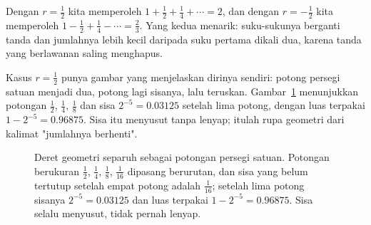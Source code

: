 Dengan $r = \tfrac{1}{2}$ kita memperoleh $1 + \tfrac{1}{2} + \tfrac{1}{4} + \cdots = 2$,
dan dengan $r = -\tfrac{1}{2}$ kita memperoleh $1 - \tfrac{1}{2} + \tfrac{1}{4} - \cdots
= \tfrac{2}{3}$. Yang kedua menarik: suku-sukunya berganti tanda dan jumlahnya lebih
kecil daripada suku pertama dikali dua, karena tanda yang berlawanan saling menghapus.

Kasus $r=\tfrac{1}{2}$ punya gambar yang menjelaskan dirinya sendiri: potong persegi
satuan menjadi dua, potong lagi sisanya, lalu teruskan. Gambar~\ref{fig:potong-geometri}
menunjukkan potongan $\tfrac12$, $\tfrac14$, $\tfrac18$ dan sisa $2^{-5} = 0.03125$
setelah lima potong, dengan luas terpakai $1 - 2^{-5} = 0.96875$. Sisa itu menyusut
tanpa lenyap; itulah rupa geometri dari kalimat "jumlahnya berhenti".

\begin{figure}[htbp]
\centering
{}
\caption{Deret geometri separuh sebagai potongan persegi satuan. Potongan berukuran
$\tfrac12$, $\tfrac14$, $\tfrac18$, $\tfrac1{16}$ dipasang berurutan, dan sisa yang
belum tertutup setelah empat potong adalah $\tfrac1{16}$; setelah lima potong sisanya
$2^{-5} = 0.03125$ dan luas terpakai $1 - 2^{-5} = 0.96875$. Sisa selalu menyusut,
tidak pernah lenyap.}
\label{fig:potong-geometri}
\end{figure}

